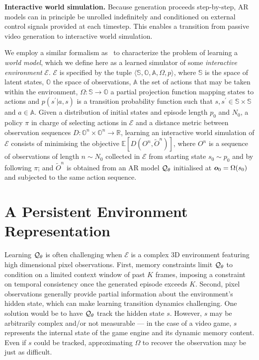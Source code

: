 \documentclass{article}
\theoremstyle{plain}
\theoremstyle{definition}
\theoremstyle{remark}
\begin{document}
\textbf{Interactive world simulation.} Because generation proceeds step-by-step, AR models can in principle be unrolled indefinitely and conditioned on external control signals provided at each timestep.
This enables a transition from passive video generation to interactive world simulation. 

We employ a similar formalism as~\citet{valevski2024diffusionmodelsrealtimegame} to characterize the problem of learning a \textit{world model}, which we define here as a learned simulator of some \textit{interactive environment} $\mathcal{E}$.
$\mathcal{E}$ is specified by the tuple $\langle \mathbb{S}, \mathbb{O}, \mathbb{A}, \Omega, p\rangle$, where $\mathbb{S}$ is the space of latent states, $\mathbb{O}$ the space of observations, $\mathbb{A}$ the set of actions that may be taken within the environment, $\Omega : \mathbb{S} \rightarrow \mathbb{O}$ a partial projection function mapping states to actions and $p(s^\prime|a,s)$ is a transition probability function such that $s,s^\prime \in \mathbb{S}\times\mathbb{S}$ and $a \in \mathbb{A}$. 
Given a distribution of initial states and episode length $p_0$ and $N_0$, a policy $\pi$ in charge of selecting actions in $\mathcal{E}$ and a distance metric between observation sequences $D : \mathbb{O}^n \times \mathbb{O}^n \rightarrow \mathbb{R}$, learning an interactive world simulation of $\mathcal{E}$ consists of minimising the objective $\mathbb{E}[D(O^n, \tilde{O}^n)]$, where $O^n$ is a sequence of observations of length $n\sim N_0$ collected in $\mathcal{E}$ from starting state $s_0\sim p_0$ and by following $\pi$; and $\tilde{O}^n$ is obtained from an AR model ${\mathcal{Q}}_\theta$ initialised at ${\bm{o}}_0 = \Omega(s_0)$ and subjected to the same action sequence.

\section{A Persistent Environment Representation}
Learning ${\mathcal{Q}}_\theta$ is often challenging when $\mathcal{E}$ is a complex 3D environment featuring high dimensional pixel observations.
First, memory constraints limit ${\mathcal{Q}}_\theta$ to condition on a limited context window of past $K$ frames, imposing a constraint on temporal consistency once the generated episode exceeds $K$. 
Second, pixel observations generally provide partial information about the environment's hidden state, which can make learning transition dynamics challenging. %
One solution would be to have ${\mathcal{Q}}_\theta$ track the hidden state $s$. However, $s$ may be arbitrarily complex and/or not measurable --- in the case of a video game, $s$ represents the internal state of the game engine and its dynamic memory content.
Even if $s$ could be tracked, approximating $\Omega$ to recover the observation may be just as difficult.
\end{document}
